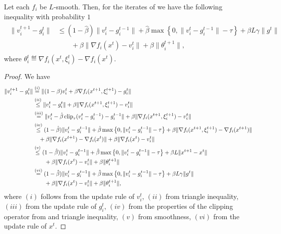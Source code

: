 \documentclass[a4paper,11pt]{article}
\begin{document}
\begin{lemma}\label{lem:lemma17} Let each $f_i$ be $L$-smooth. Then, for the iterates of  we have the following inequality with probability $1$
\begin{align}
\begin{aligned}
    \|v_i^{t+1} - g_i^t\| &\le (1-\hat{\beta})\|v_i^t - g_i^{t-1}\|
        + \hat{\beta}\max\left\{0, \|v_i^t-g_i^{t-1}\| - \tau\right\}
        + \beta L\gamma\|g^t\| \\
        &\qquad + \beta\|\nabla f_i(x^t)-v_i^t\|
        + \beta\|\theta^{t+1}_i\|,
\end{aligned}
\end{align}
where $\theta_i^t \eqdef \nabla f_i(x^t,\xi^t_i) - \nabla f_i(x^t)$.
\end{lemma}
\begin{proof}
    We have 
    \begin{align*}
        \|v_i^{t+1} - g_i^t\| &\overset{(i)}{=} \|(1-\beta)v_i^t + \beta\nabla f_i(x^{t+1}, \xi^{t+1}_i) - g_i^t\|\\
        &\overset{(ii)}{\le} \|v_i^t-g_i^t\| + \beta\|\nabla f_i(x^{t+1},\xi^{t+1}_i) - v_i^t\|\\
        &\overset{(iii)}{=} \|v_i^t - \hat{\beta}\operatorname{clip}_{\tau}(v_i^t - g_i^{t-1}) - g_i^{t-1}\|
        + \beta\|\nabla f_i(x^{t+1},\xi^{t+1}_i) - v_i^t\|\\ 
        &\overset{(iv)}{\le} (1-\hat{\beta})\|v_i^t - g_i^{t-1}\|
        + \hat{\beta}\max\left\{0, \|v_i^t-g_i^{t-1}\| - \tau\right\}
        + \beta\|\nabla f_i(x^{t+1},\xi_i^{t+1}) - \nabla f_i(x^{t+1})\|\\
        & \quad  +  \beta\|\nabla f_i(x^{t+1})-\nabla f_i(x^t)\|
        + \beta\|\nabla f_i(x^{t})-v_i^t\|\\
        &\overset{(v)}{\le} (1-\hat{\beta})\|v_i^t - g_i^{t-1}\|
        + \hat{\beta}\max\left\{0, \|v_i^t-g_i^{t-1}\| - \tau\right\}
        + \beta L\|x^{t+1} - x^t\|\\ 
        &\qquad + \beta\|\nabla f_i(x^t)-v_i^t\|
        + \beta\|\theta^{t+1}_i\|\\
        &\overset{(vi)}{=} (1-\hat{\beta})\|v_i^t - g_i^{t-1}\|
        + \hat{\beta}\max\left\{0, \|v_i^t-g_i^{t-1}\| - \tau\right\}
        + \beta L\gamma\|g^t\| \\
        &\qquad + \beta\|\nabla f_i(x^t)-v_i^t\|
        + \beta\|\theta^{t+1}_i\|,
    \end{align*}
    where $(i)$ follows from the update rule of $v_i^t$, $(ii)$ from triangle inequality, $(iii)$ from the update rule of $g_i^t$,  $(iv)$ from the properties of the clipping operator from  and triangle inequality,  $(v)$ from smoothness, $(vi)$ from the update rule of $x^t.$
\end{proof}
\end{document}
